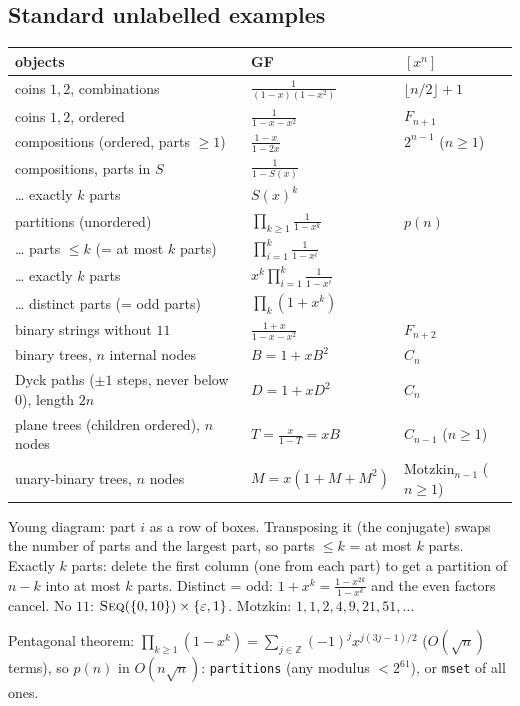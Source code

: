 	\subsection{Standard unlabelled examples}
	\begin{center}\small\renewcommand{\arraystretch}{1.3}
	\begin{tabular}{@{}L{3.45cm}@{\ \ }l@{\ \ }l@{}}
	objects & GF & $[x^n]$ \\ \hline
	coins $1,2$, combinations & $\frac1{(1-x)(1-x^2)}$ & $\lfloor n/2\rfloor+1$ \\
	coins $1,2$, ordered & $\frac1{1-x-x^2}$ & $F_{n+1}$ \\
	compositions (ordered, parts $\ge1$) & $\frac{1-x}{1-2x}$ & $2^{n-1}$ ($n\ge1$) \\
	compositions, parts in $S$ & $\frac1{1-S(x)}$ & \\
	\ldots{} exactly $k$ parts & $S(x)^k$ & \\
	partitions (unordered) & $\prod_{k\ge1}\frac1{1-x^k}$ & $p(n)$ \\
	\ldots{} parts $\le k$ (= at most $k$ parts) & $\prod_{i=1}^k\frac1{1-x^i}$ & \\
	\ldots{} exactly $k$ parts & $x^k\prod_{i=1}^k\frac1{1-x^i}$ & \\
	\ldots{} distinct parts (= odd parts) & $\prod_k(1+x^k)$ & \\
	binary strings without $11$ & $\frac{1+x}{1-x-x^2}$ & $F_{n+2}$ \\
	binary trees, $n$ internal nodes & $B=1+xB^2$ & $C_n$ \\
	Dyck paths ($\pm1$ steps, never below $0$), length $2n$ & $D=1+xD^2$ & $C_n$ \\
	plane trees (children ordered), $n$ nodes & $T=\frac{x}{1-T}=xB$ & $C_{n-1}$ ($n\ge1$) \\
	unary-binary trees, $n$ nodes & $M=x(1+M+M^2)$ & Motzkin$_{n-1}$ ($n\ge1$) \\
	\end{tabular}
	\end{center}
	Young diagram: part $i$ as a row of boxes. Transposing it (the conjugate) swaps the number of parts and the largest part, so parts $\le k$ = at most $k$ parts. Exactly $k$ parts: delete the first column (one from each part) to get a partition of $n-k$ into at most $k$ parts. Distinct = odd: $1+x^k=\frac{1-x^{2k}}{1-x^k}$ and the even factors cancel. No $11$: $\textsc{Seq}(\{0,10\})\times\{\varepsilon,1\}$. Motzkin: $1,1,2,4,9,21,51,\dots$

	Pentagonal theorem: $\prod_{k\ge1}(1-x^k)=\sum_{j\in\mathbb Z}(-1)^jx^{j(3j-1)/2}$ ($O(\sqrt n)$ terms), so $p(n)$ in $O(n\sqrt n)$: \texttt{partitions} (any modulus $<2^{61}$), or \texttt{mset} of all ones.

